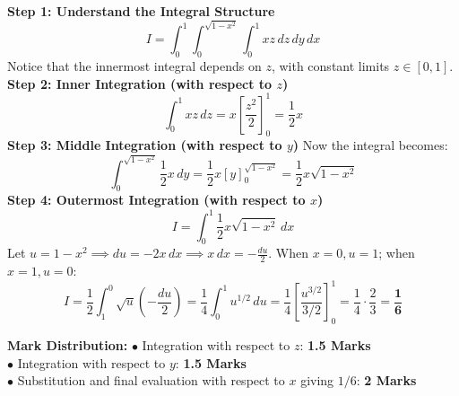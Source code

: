 \begin{solutionbox}
\textbf{Step 1: Understand the Integral Structure}
\[
I = \int_0^1 \int_0^{\sqrt{1-x^2}} \int_0^1 x z \, dz \, dy \, dx
\]
Notice that the innermost integral depends on $z$, with constant limits $z \in [0, 1]$.
\textbf{Step 2: Inner Integration (with respect to $z$)}
\[
\int_0^1 x z \, dz = x \left[ \frac{z^2}{2} \right]_0^1 = \frac{1}{2} x
\]
\textbf{Step 3: Middle Integration (with respect to $y$)}
Now the integral becomes:
\[
\int_0^{\sqrt{1-x^2}} \frac{1}{2} x \, dy = \frac{1}{2} x [y]_0^{\sqrt{1-x^2}} = \frac{1}{2} x \sqrt{1 - x^2}
\]
\textbf{Step 4: Outermost Integration (with respect to $x$)}
\[
I = \int_0^1 \frac{1}{2} x \sqrt{1 - x^2} \, dx
\]
Let $u = 1 - x^2 \implies du = -2x \, dx \implies x \, dx = -\frac{du}{2}$.
When $x = 0, u = 1$; when $x = 1, u = 0$:
\[
I = \frac{1}{2} \int_1^0 \sqrt{u} \left(-\frac{du}{2}\right) = \frac{1}{4} \int_0^1 u^{1/2} \, du = \frac{1}{4} \left[ \frac{u^{3/2}}{3/2} \right]_0^1 = \frac{1}{4} \cdot \frac{2}{3} = \mathbf{\frac{1}{6}}
\]

\begin{markingrubric}
\textbf{Mark Distribution:}
$\bullet$ Integration with respect to $z$: \textbf{1.5 Marks}\\
$\bullet$ Integration with respect to $y$: \textbf{1.5 Marks}\\
$\bullet$ Substitution and final evaluation with respect to $x$ giving $1/6$: \textbf{2 Marks}
\end{markingrubric}
\end{solutionbox}

\newpage
